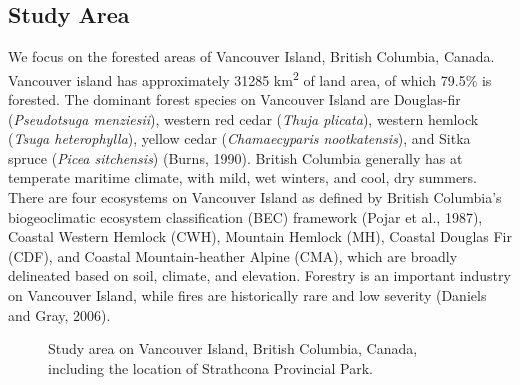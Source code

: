 \documentclass[
]{agujournal2019}
\begin{document}
\subsection{Study Area}\label{study-area}

We focus on the forested areas of Vancouver Island, British Columbia,
Canada. Vancouver island has approximately 31285 km\textsuperscript{2}
of land area, of which 79.5\% is forested. The dominant forest species
on Vancouver Island are Douglas-fir (\emph{Pseudotsuga menziesii}),
western red cedar (\emph{Thuja plicata}), western hemlock (\emph{Tsuga
heterophylla}), yellow cedar (\emph{Chamaecyparis nootkatensis}), and
Sitka spruce (\emph{Picea sitchensis}) (Burns, 1990). British Columbia
generally has at temperate maritime climate, with mild, wet winters, and
cool, dry summers. There are four ecosystems on Vancouver Island as
defined by British Columbia's biogeoclimatic ecosystem classification
(BEC) framework (Pojar et al., 1987), Coastal Western Hemlock (CWH),
Mountain Hemlock (MH), Coastal Douglas Fir (CDF), and Coastal
Mountain-heather Alpine (CMA), which are broadly delineated based on
soil, climate, and elevation. Forestry is an important industry on
Vancouver Island, while fires are historically rare and low severity
(Daniels and Gray, 2006).

\label{cell-fig-study}
\begin{figure}[H]


\caption{\label{fig-study}Study area on Vancouver Island, British
Columbia, Canada, including the location of Strathcona Provincial Park.}

\end{figure}%
\end{document}
